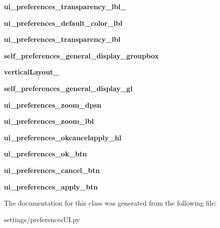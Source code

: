 \begin{DoxyCompactItemize}
{\bfseries ui\+\_\+preferences\+\_\+transparency\+\_\+lbl\+\_}
\item 
\hypertarget{a00107_a2469ae136e448dd1df44686ae61f5f01}{}\label{a00107_a2469ae136e448dd1df44686ae61f5f01} 
{\bfseries ui\+\_\+preferences\+\_\+default\+\_\+color\+\_\+lbl}
\item 
\hypertarget{a00107_a243905c4e84872947db1bb8dcedadda4}{}\label{a00107_a243905c4e84872947db1bb8dcedadda4} 
{\bfseries ui\+\_\+preferences\+\_\+transparency\+\_\+lbl}
\item 
\hypertarget{a00107_a24dafe3bdccfb5c2439cca09d041f8e2}{}\label{a00107_a24dafe3bdccfb5c2439cca09d041f8e2} 
{\bfseries self\+\_\+preferences\+\_\+general\+\_\+display\+\_\+groupbox}
\item 
\hypertarget{a00107_a770a35129466bdc08cfc70c1a31d74d0}{}\label{a00107_a770a35129466bdc08cfc70c1a31d74d0} 
{\bfseries vertical\+Layout\+\_}
\item 
\hypertarget{a00107_a34e66b85aedb9d531bd13e099c4abd17}{}\label{a00107_a34e66b85aedb9d531bd13e099c4abd17} 
{\bfseries self\+\_\+preferences\+\_\+general\+\_\+display\+\_\+gl}
\item 
\hypertarget{a00107_ab9f4bd205de45a28fb6df5fd10a11e13}{}\label{a00107_ab9f4bd205de45a28fb6df5fd10a11e13} 
{\bfseries ui\+\_\+preferences\+\_\+zoom\+\_\+dpsn}
\item 
\hypertarget{a00107_a8321ca1cf385acdcd4a23a9aeba71982}{}\label{a00107_a8321ca1cf385acdcd4a23a9aeba71982} 
{\bfseries ui\+\_\+preferences\+\_\+zoom\+\_\+lbl}
\item 
\hypertarget{a00107_abeeea5dce817fab1714dcfea02931865}{}\label{a00107_abeeea5dce817fab1714dcfea02931865} 
{\bfseries ui\+\_\+preferences\+\_\+okcancelapply\+\_\+hl}
\item 
\hypertarget{a00107_a191d2ad10ffb160b79b7795e05fe37e3}{}\label{a00107_a191d2ad10ffb160b79b7795e05fe37e3} 
{\bfseries ui\+\_\+preferences\+\_\+ok\+\_\+btn}
\item 
\hypertarget{a00107_a47ad79d67a89e77f0cf358171fac15b2}{}\label{a00107_a47ad79d67a89e77f0cf358171fac15b2} 
{\bfseries ui\+\_\+preferences\+\_\+cancel\+\_\+btn}
\item 
\hypertarget{a00107_a3f0de42b6f49c050f03b806cfc7541f7}{}\label{a00107_a3f0de42b6f49c050f03b806cfc7541f7} 
{\bfseries ui\+\_\+preferences\+\_\+apply\+\_\+btn}
\end{DoxyCompactItemize}


The documentation for this class was generated from the following file\+:\begin{DoxyCompactItemize}
\item 
settings/preferences\+U\+I.\+py\end{DoxyCompactItemize}
